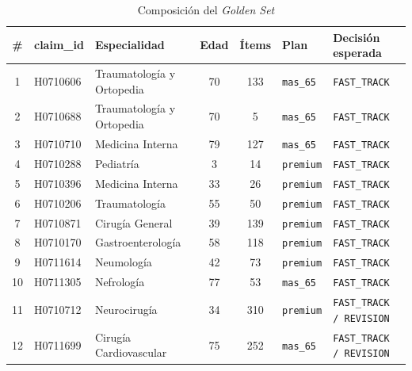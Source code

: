 \begin{table}[H]
    \centering
    \caption{Composición del \textit{Golden Set}}
    \label{tab:composicion-golden-set}

    \scriptsize
    \setlength{\tabcolsep}{3.5pt}
    \renewcommand{\arraystretch}{1.15}

    \begin{tabular}{
        c
        l
        p{}
        c
        c
        l
        p{}
    }
        \toprule
        \textbf{\#}
        & \textbf{claim\_id}
        & \textbf{Especialidad}
        & \textbf{Edad}
        & \textbf{Ítems}
        & \textbf{Plan}
        & \textbf{Decisión esperada} \\
        \midrule

        1  & H0710606 & Traumatología y Ortopedia & 70 & 133 & \texttt{mas\_65} & \texttt{FAST\_TRACK} \\
        2  & H0710688 & Traumatología y Ortopedia & 70 & 5   & \texttt{mas\_65} & \texttt{FAST\_TRACK} \\
        3  & H0710710 & Medicina Interna           & 79 & 127 & \texttt{mas\_65} & \texttt{FAST\_TRACK} \\
        4  & H0710288 & Pediatría                   & 3  & 14  & \texttt{premium} & \texttt{FAST\_TRACK} \\
        5  & H0710396 & Medicina Interna            & 33 & 26  & \texttt{premium} & \texttt{FAST\_TRACK} \\
        6  & H0710206 & Traumatología               & 55 & 50  & \texttt{premium} & \texttt{FAST\_TRACK} \\
        7  & H0710871 & Cirugía General             & 39 & 139 & \texttt{premium} & \texttt{FAST\_TRACK} \\
        8  & H0710170 & Gastroenterología           & 58 & 118 & \texttt{premium} & \texttt{FAST\_TRACK} \\
        9  & H0711614 & Neumología                  & 42 & 73  & \texttt{premium} & \texttt{FAST\_TRACK} \\
        10 & H0711305 & Nefrología                   & 77 & 53  & \texttt{mas\_65} & \texttt{FAST\_TRACK} \\
        11 & H0710712 & Neurocirugía                 & 34 & 310 & \texttt{premium} & \texttt{FAST\_TRACK / REVISION} \\
        12 & H0711699 & Cirugía Cardiovascular       & 75 & 252 & \texttt{mas\_65} & \texttt{FAST\_TRACK / REVISION} \\

\end{tabular}
\end{table}
